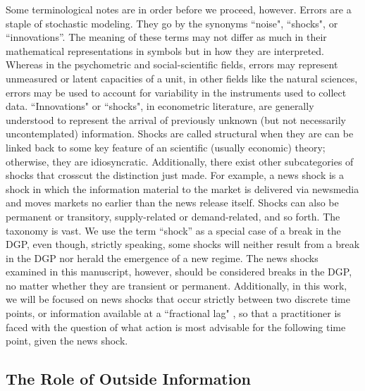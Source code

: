 \documentclass[11pt]{article}
\theoremstyle{definition}
\begin{document}
 Some terminological notes are in order before we proceed, however.  Errors are a staple of stochastic modeling.  They go by the synonyms ``noise", ``shocks", or ``innovations''.  The meaning of these terms may not differ as much in their mathematical representations in symbols but in how they are interpreted.  Whereas in the psychometric and social-scientific fields, errors may represent unmeasured or latent capacities of a unit, in other fields like the natural sciences, errors may be used to account for variability in the instruments used to collect data.  ``Innovations" or ``shocks", in econometric literature, are generally understood to represent the arrival of previously unknown (but not necessarily uncontemplated) information.  Shocks are called structural when they are can be linked back to some key feature of an scientific (usually economic) theory; otherwise, they are idiosyncratic.  Additionally, there exist other subcategories of shocks that crosscut the distinction just made.  For example, a news shock is a shock in which the information material to the market is delivered via newsmedia and moves markets no earlier than the news release itself.  Shocks can also be permanent or transitory, supply-related or demand-related, and so forth.  The taxonomy is vast.  We use the term ``shock'' as a special case of a break in the DGP, even though, strictly speaking, some shocks will neither result from a break in the DGP nor herald the emergence of a new regime.  The news shocks examined in this manuscript, however, should be considered breaks in the DGP, no matter whether they are transient or permanent.  Additionally, in this work, we will be focused on news shocks that occur strictly between two discrete time points, or information available at a ``fractional lag" \citep{castle2011forecasting}, so that a practitioner is faced with the question of what action is most advisable for the following time point, given the news shock.

 

\subsection{The Role of Outside Information}\label{outside_info}
\end{document}
